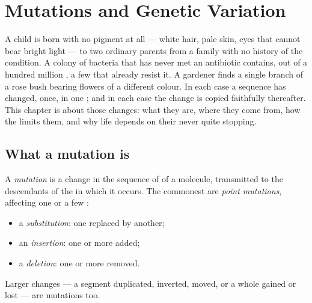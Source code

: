 \chapter{Mutations and Genetic Variation}\label{ch:g11:mutations}

A child is born with no pigment at all --- white hair, pale skin, eyes
that cannot bear bright light --- to two ordinary parents from a family
with no history of the condition. A colony of bacteria that has never
met an antibiotic contains, out of a hundred million , a few that
already resist it. A gardener finds a single branch of a rose bush
bearing flowers of a different colour. In each case a  sequence has
changed, once, in one ; and in each case the change is copied
faithfully thereafter. This chapter is about those changes: what they
are, where they come from, how the  limits them, and why life
depends on their never quite stopping.

\section{What a mutation is}

\begin{definition}[Mutation]\label{def:g11:mutations:mutation}
A \emph{mutation} is a change in the sequence of
 of a  molecule, transmitted to the descendants of the
 in which it occurs. The commonest are \emph{point mutations},
affecting one or a few :
\begin{itemize}
  \item a \emph{substitution}: one  replaced by another;
  \item an \emph{insertion}: one or more  added;
  \item a \emph{deletion}: one or more  removed.
\end{itemize}
Larger changes --- a segment duplicated, inverted, moved, or a whole
 gained or lost --- are mutations too.
\end{definition}

